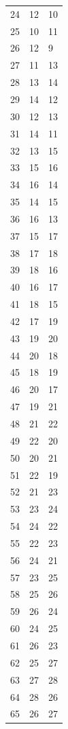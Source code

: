 \documentclass[a4paper,11pt]{article}
\begin{document}
\begin{center}
\begin{longtable}{|R{1.5cm}|R{1.5cm}|R{1.5cm}|}
   24 &   12 &   10 \\
   25 &   10 &   11 \\
   26 &   12 &    9 \\
   27 &   11 &   13 \\
   28 &   13 &   14 \\
   29 &   14 &   12 \\
   30 &   12 &   13 \\
   31 &   14 &   11 \\
   32 &   13 &   15 \\
   33 &   15 &   16 \\
   34 &   16 &   14 \\
   35 &   14 &   15 \\
   36 &   16 &   13 \\
   37 &   15 &   17 \\
   38 &   17 &   18 \\
   39 &   18 &   16 \\
   40 &   16 &   17 \\
   41 &   18 &   15 \\
   42 &   17 &   19 \\
   43 &   19 &   20 \\
   44 &   20 &   18 \\
   45 &   18 &   19 \\
   46 &   20 &   17 \\
   47 &   19 &   21 \\
   48 &   21 &   22 \\
   49 &   22 &   20 \\
   50 &   20 &   21 \\
   51 &   22 &   19 \\
   52 &   21 &   23 \\
   53 &   23 &   24 \\
   54 &   24 &   22 \\
   55 &   22 &   23 \\
   56 &   24 &   21 \\
   57 &   23 &   25 \\
   58 &   25 &   26 \\
   59 &   26 &   24 \\
   60 &   24 &   25 \\
   61 &   26 &   23 \\
   62 &   25 &   27 \\
   63 &   27 &   28 \\
   64 &   28 &   26 \\
   65 &   26 &   27 \\

\end{longtable}
\end{center}
\end{document}
